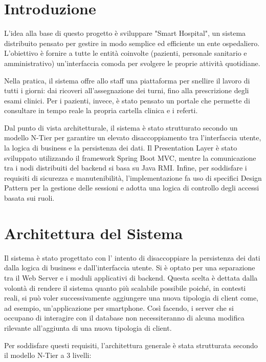 \chapter*{Introduzione}
L'idea alla base di questo progetto è sviluppare "Smart Hospital", un sistema distribuito pensato per gestire in modo semplice ed efficiente un ente ospedaliero. L'obiettivo è fornire a tutte le entità coinvolte (pazienti, personale sanitario e amministrativo) un'interfaccia comoda per svolgere le proprie attività quotidiane.

Nella pratica, il sistema offre allo staff una piattaforma per snellire il lavoro di tutti i giorni: dai ricoveri all'assegnazione dei turni, fino alla prescrizione degli esami clinici. Per i pazienti, invece, è stato pensato un portale che permette di consultare in tempo reale la propria cartella clinica e i referti.

Dal punto di vista architetturale, il sistema è stato strutturato secondo un modello N-Tier per garantire un elevato disaccoppiamento tra l'interfaccia utente, la logica di business e la persistenza dei dati. Il Presentation Layer è stato sviluppato utilizzando il framework Spring Boot MVC, mentre la comunicazione tra i nodi distribuiti del backend si basa su Java RMI. Infine, per soddisfare i requisiti di sicurezza e manutenibilità, l'implementazione fa uso di specifici Design Pattern per la gestione delle sessioni e adotta una logica di controllo degli accessi basata sui ruoli.

\chapter{Architettura del Sistema}
Il sistema è stato progettato con l' intento di disaccoppiare la persistenza dei dati dalla logica di business e dall'interfaccia utente. Si è optato per una separazione tra il Web Server e i moduli applicativi di backend. Questa scelta è dettata dalla volontà di rendere il sistema quanto più scalabile possibile poiché, in contesti reali, si può voler successivamente aggiungere una nuova tipologia di client come, ad esempio, un'applicazione per smartphone. Così facendo, i server che si occupano di interagire con il database non necessiteranno di alcuna modifica rilevante all'aggiunta di una nuova tipologia di client.

Per soddisfare questi requisiti, l'architettura generale è stata strutturata secondo il modello N-Tier a 3 livelli:

